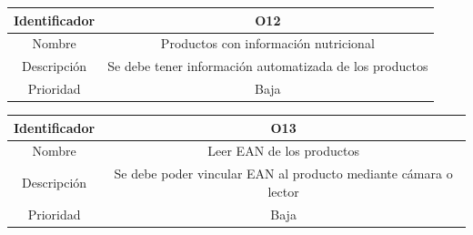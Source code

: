 \vspace{1em}
\par
\begin{tabular}{||c|c||} 
\hline
Identificador & O12 \\ [0.5ex] 
\hline\hline
Nombre & Productos con información nutricional \\ 
\hline
Descripción & Se debe tener información automatizada de los productos \\
\hline
Prioridad & Baja \\ [1ex] 
\hline
\end{tabular}

\vspace{1em}
\par
\begin{tabular}{||c|c||} 
\hline
Identificador & O13 \\ [0.5ex] 
\hline\hline
Nombre & Leer EAN de los productos \\ 
\hline
Descripción & Se debe poder vincular EAN al producto mediante cámara o lector \\
\hline
Prioridad & Baja \\ [1ex] 
\hline
\end{tabular}


